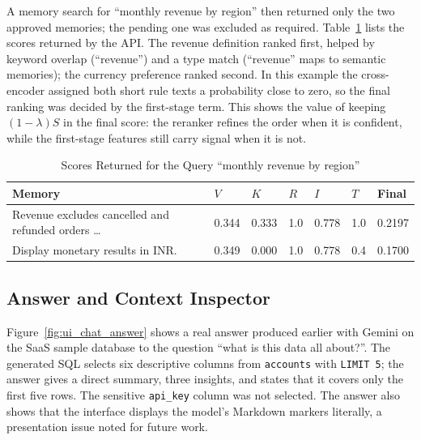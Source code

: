 \begin{figure}[H]
    \centering
    \hfill
\end{figure}

A memory search for ``monthly revenue by region'' then returned only the two approved
memories; the pending one was excluded as required. Table~\ref{tab:search_example} lists the
scores returned by the API. The revenue definition ranked first, helped by keyword overlap
(``revenue'') and a type match (``revenue'' maps to semantic memories); the currency
preference ranked second. In this example the cross-encoder assigned both short rule texts
a probability close to zero, so the final ranking was decided by the first-stage term. This
shows the value of keeping $(1-\lambda)S$ in the final score: the reranker refines the
order when it is confident, while the first-stage features still carry signal when it is
not.

\begin{table}[H]
    \centering
    \small
    \caption{Scores Returned for the Query ``monthly revenue by region''}
    \begin{tabular}{p{4.8cm} p{0.9cm} p{0.9cm} p{0.9cm} p{0.9cm} p{0.9cm} p{1.4cm}}
        \toprule
        \textbf{Memory} & $V$ & $K$ & $R$ & $I$ & $T$ & \textbf{Final} \\
        \midrule
        Revenue excludes cancelled and refunded orders \ldots & 0.344 & 0.333 & 1.0 & 0.778 & 1.0 & 0.2197 \\[3pt]
        Display monetary results in INR.                      & 0.349 & 0.000 & 1.0 & 0.778 & 0.4 & 0.1700 \\
        \bottomrule
    \end{tabular}
    \label{tab:search_example}
\end{table}

\subsection{Answer and Context Inspector}
Figure~\ref{fig:ui_chat_answer} shows a real answer produced earlier with Gemini on the
SaaS sample database to the question ``what is this data all about?''. The generated SQL
selects six descriptive columns from \texttt{accounts} with \texttt{LIMIT 5}; the answer
gives a direct summary, three insights, and states that it covers only the first five rows.
The sensitive \texttt{api\_key} column was not selected. The answer also shows that the
interface displays the model's Markdown markers literally, a presentation issue noted for
future work.

